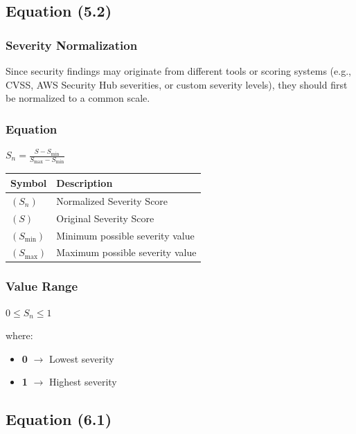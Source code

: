 \subsection{Equation (5.2)}

\subsubsection{Severity Normalization}

Since security findings may originate from different tools or scoring systems (e.g., CVSS, AWS Security Hub severities, or custom severity levels), they should first be normalized to a common scale.

\subsubsection{\texorpdfstring{\textbf{Equation}}{Equation}}

$S_n = \frac{S - S_{\min}}{S_{\max} - S_{\min}}$


\begin{longtable}[]{@{}ll@{}}
\toprule\noalign{}
Symbol & Description \\
\midrule\noalign{}
\endhead
\bottomrule\noalign{}
\endlastfoot
$(S_n)$ & Normalized Severity Score \\
$(S)$ & Original Severity Score \\
$(S_{\min})$ & Minimum possible severity value \\
$(S_{\max})$ & Maximum possible severity value \\
\end{longtable}

\subsubsection{\texorpdfstring{\textbf{Value Range}}{Value Range}}

$0 \leq S_n \leq 1$

where:

\begin{itemize}
\tightlist
\item
  \textbf{0} \(\rightarrow\) Lowest severity\\
\item
  \textbf{1} \(\rightarrow\) Highest severity
\end{itemize}

\subsection{Equation (6.1)}

